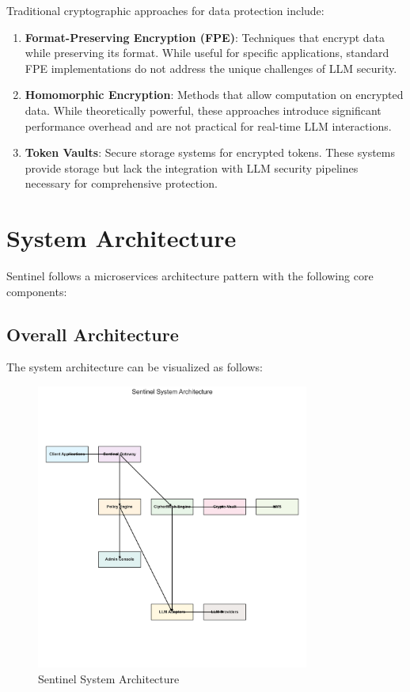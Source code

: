 \documentclass[12pt]{article}
\begin{document}
Traditional cryptographic approaches for data protection include:

\begin{enumerate}
    \item \textbf{Format-Preserving Encryption (FPE)}: Techniques that encrypt data while preserving its format. While useful for specific applications, standard FPE implementations do not address the unique challenges of LLM security.
    
    \item \textbf{Homomorphic Encryption}: Methods that allow computation on encrypted data. While theoretically powerful, these approaches introduce significant performance overhead and are not practical for real-time LLM interactions.
    
    \item \textbf{Token Vaults}: Secure storage systems for encrypted tokens. These systems provide storage but lack the integration with LLM security pipelines necessary for comprehensive protection.
\end{enumerate}

\section{System Architecture}

Sentinel follows a microservices architecture pattern with the following core components:

\subsection{Overall Architecture}

The system architecture can be visualized as follows:

\begin{figure}[H]
    \centering
    \includegraphics[width=0.8\textwidth]{figures/system_architecture.png}
    \caption{Sentinel System Architecture}
    \label{fig:system_architecture}
\end{figure}
\end{document}
